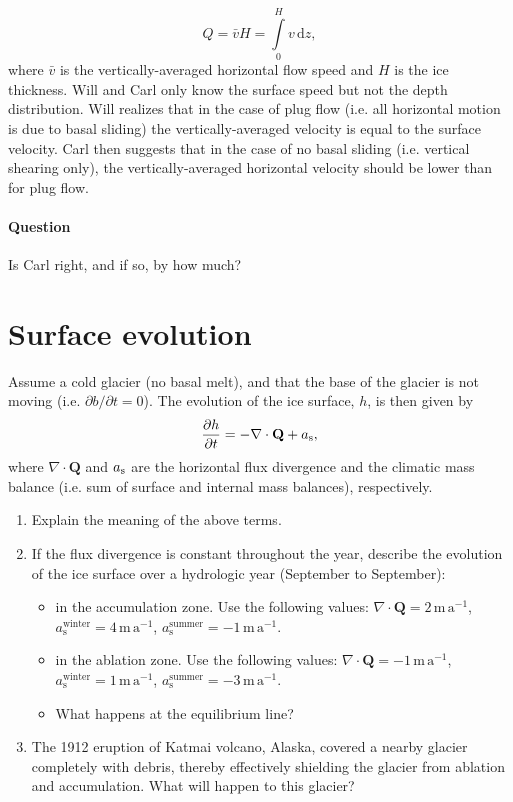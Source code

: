 \documentclass[parskip=half]{scrartcl}
\begin{document}
\begin{equation}
Q = \bar v H = \int \limits_0^H v\, \mathrm{d}z,
\end{equation}
where $\bar v$ is the vertically-averaged horizontal flow speed and $H$ is the ice thickness. Will and Carl only know the surface speed but not the depth distribution. Will realizes that in the case of plug flow (i.e. all horizontal motion is due to basal sliding) the vertically-averaged velocity is equal to the surface velocity. Carl then suggests that in the case of no basal sliding (i.e. vertical shearing only), the vertically-averaged horizontal velocity should be lower than for plug flow.

\paragraph{Question} Is Carl right, and if so, by how much?

\section{Surface evolution}

Assume a cold glacier (no basal melt), and that the base of the glacier is not moving (i.e. $\partial b / \partial t = 0$). The evolution of the ice surface, $h$, is then given by
\begin{equation} \label{eq:upper-surface-evolution}
\frac{\partial h}{\partial t} = - \nabla \cdot \mathbf{Q} + a_{\textrm s},
\end{equation}
where $\nabla \cdot \mathbf{Q}$ and $a_{\textrm s}$ are the horizontal flux divergence and the climatic mass balance (i.e. sum of surface and internal mass balances), respectively.
\begin{enumerate}
\item Explain the meaning of the above terms.
\item If the flux divergence is constant throughout the year, describe the evolution of the ice surface over a hydrologic year (September to September):
  \begin{itemize}
    \item in the accumulation zone. Use the following values: $\nabla \cdot \mathbf{Q} = 2\,\mathrm{m}\,\mathrm{a}^{-1}$, $a_{\mathrm{s}}^{\mathrm{winter}}= 4\,\mathrm{m}\,\mathrm{a}^{-1}$, $a_{\mathrm{s}}^{\mathrm{summer}} = -1\,\mathrm{m}\,\mathrm{a}^{-1}$.
    \item in the ablation zone. Use the following values: $\nabla \cdot \mathbf{Q} = -1\,\mathrm{m}\,\mathrm{a}^{-1}$, $a_{\mathrm{s}}^{\mathrm{winter}}= 1\,\mathrm{m}\,\mathrm{a}^{-1}$, $a_{\mathrm{s}}^{\mathrm{summer}} = -3\,\mathrm{m}\,\mathrm{a}^{-1}$.
    \item What happens at the equilibrium line?
  \end{itemize}
\item The 1912 eruption of Katmai volcano, Alaska, covered a nearby glacier completely with debris, thereby effectively shielding the glacier from ablation and accumulation. What will happen to this glacier? 
\end{enumerate}
\end{document}
